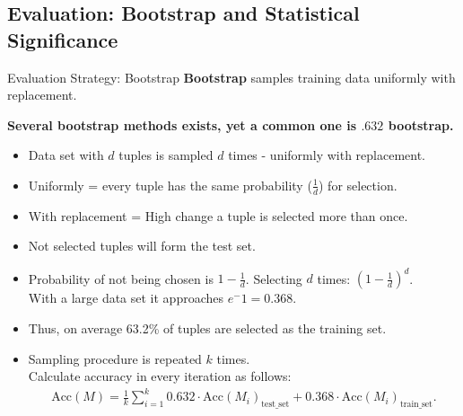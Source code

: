 \subsection*{Evaluation: Bootstrap and Statistical Significance}

\begin{frame}{Evaluation Strategy: Bootstrap}
	\textbf{Bootstrap} samples training data uniformly with replacement.

	\textbf{Several bootstrap methods exists, yet a common one is $.632$ bootstrap.}
	\begin{itemize}
		\item Data set with $d$ tuples is sampled $d$ times - uniformly with replacement.
		\item Uniformly = every tuple has the same probability ($\frac{1}{d}$) for selection.
		\item With replacement = High change a tuple is selected more than once.
		\item Not selected tuples will form the test set.
		\item Probability of not being chosen is $1-\frac{1}{d}$. Selecting $d$ times: $(1-\frac{1}{d})^d$.\\
		      With a large data set it approaches $e^-1=0.368$.
		\item Thus, on average 63.2\% of tuples are selected as the training set.
		\item Sampling procedure is repeated $k$ times.\\
		      Calculate accuracy in every iteration as follows:
		      \begin{align*}
			      \text{Acc}(M) = \frac{1}{k} \sum_{i=1}^{k} 0.632 \cdot \text{Acc}(M_i)_{\text{test\_set}} + 0.368 \cdot \text{Acc}(M_i)_{\text{train\_set}}.
		      \end{align*}
	\end{itemize}
\end{frame}

